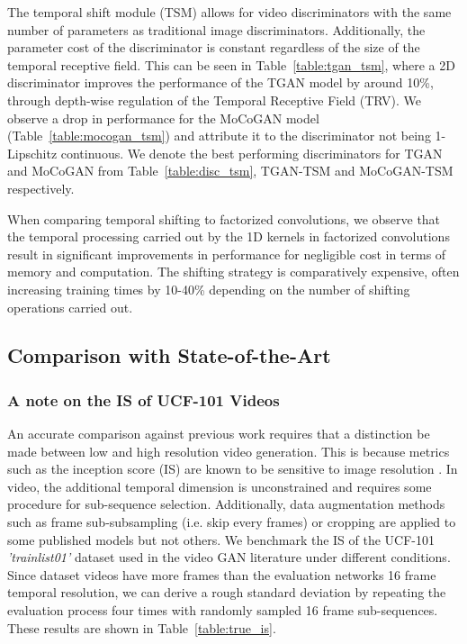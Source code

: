 \documentclass[a4paper,fleqn]{cas-sc}
\begin{document}
The temporal shift module (TSM) allows for video discriminators with the same number of parameters as traditional image discriminators. Additionally, the parameter cost of the discriminator is constant regardless of the size of the temporal receptive field. This can be seen in Table~\ref{table:tgan_tsm}, where a 2D discriminator improves the performance of the TGAN model by around 10\%, through depth-wise regulation of the Temporal Receptive Field (TRV). We observe a drop in performance for the MoCoGAN model (Table~\ref{table:mocogan_tsm}) and attribute it to the discriminator not being 1-Lipschitz continuous. We denote the best performing discriminators for TGAN and MoCoGAN from Table~\ref{table:disc_tsm}, TGAN-TSM and MoCoGAN-TSM respectively.

When comparing temporal shifting to factorized convolutions, we observe that the temporal processing carried out by the 1D kernels in factorized convolutions result in significant improvements in performance for negligible cost in terms of memory and computation. The shifting strategy is comparatively expensive, often increasing training times by 10-40\% depending on the number of shifting operations carried out.

\subsection{Comparison with State-of-the-Art}
\label{sec:sota}

\subsubsection{A note on the IS of UCF-101 Videos}
An accurate comparison against previous work requires that a distinction be made between low and high resolution video generation. This is because metrics such as the inception score (IS) are known to be sensitive to image resolution \cite{brockDS2018large,BORJI201941}. In video, the additional temporal dimension is unconstrained and requires some procedure for sub-sequence selection. Additionally, data augmentation methods such as frame sub-subsampling (i.e. skip every  frames) or cropping are applied to some published models but not others. We benchmark the IS of the UCF-101 \textit{'trainlist01'} dataset used in the video GAN literature under different conditions. Since dataset videos have more frames than the evaluation networks 16 frame temporal resolution, we can derive a rough standard deviation by repeating the evaluation process four times with randomly sampled 16 frame sub-sequences. These results are shown in Table~\ref{table:true_is}. 
\end{document}
